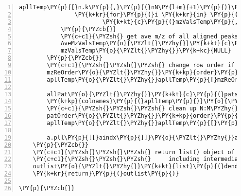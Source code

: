 \begin{Verbatim}[commandchars=\\\{\},codes={\catcode`\$=3\catcode`\^=7\catcode`\_=8},gobble=0,numbers=left,fontfamily=fvm,fontshape=n,fontsize=\footnotesize,tabsize=2]
				apllTemp\PY{p}{[}n.k\PY{p}{,}\PY{p}{(}nN\PY{l+m}{+1}\PY{p}{)}\PY{o}{:}\PY{p}{(}nN\PY{o}{+}nM\PY{p}{)}\PY{p}{]}\PY{o}{\PYZlt{}\PYZhy{}}Mpeaks\PY{p}{[}estPM\PY{p}{[}n.k\PY{p}{,}\PY{l+m}{2}\PY{p}{]}\PY{p}{,}\PY{p}{]}
				\PY{k+kr}{for}\PY{p}{(}i \PY{k+kr}{in} \PY{p}{(}nN\PY{l+m}{+1}\PY{p}{)}\PY{o}{:}\PY{p}{(}nN\PY{o}{+}nM\PY{p}{)}\PY{p}{)} \PY{k+kr}{if}\PY{p}{(}apllTemp\PY{p}{[}n.k\PY{p}{,}i\PY{p}{]}\PY{o}{\PYZgt{}}\PY{l+m}{0}\PY{p}{)} mzValsTemp\PY{o}{\PYZlt{}\PYZhy{}}
						\PY{k+kt}{c}\PY{p}{(}mzValsTemp\PY{p}{,}Mpeaklist\PY{p}{[[}i\PY{o}{\PYZhy{}}nN\PY{p}{]]}\PY{p}{[}\PY{l+m}{1}\PY{p}{,}apllTemp\PY{p}{[}n.k\PY{p}{,}i\PY{p}{]]}\PY{p}{)}
			\PY{p}{\PYZcb{}}
			\PY{c+c1}{\PYZsh{} get ave m/z of all aligned peaks}
			AveMzValsTemp\PY{o}{\PYZlt{}\PYZhy{}}\PY{k+kt}{c}\PY{p}{(}AveMzValsTemp\PY{p}{,}\PY{k+kp}{mean}\PY{p}{(}mzValsTemp\PY{p}{)}\PY{p}{)} 
			mzValsTemp\PY{o}{\PYZlt{}\PYZhy{}}\PY{k+kc}{NULL}
		\PY{p}{\PYZcb{}}
		\PY{c+c1}{\PYZsh{}\PYZsh{}\PYZsh{} change row order if averaging m/z has changed peak location order}
		mzReOrder\PY{o}{\PYZlt{}\PYZhy{}}\PY{k+kp}{order}\PY{p}{(}AveMzValsTemp\PY{p}{)}
		apllTemp\PY{o}{\PYZlt{}\PYZhy{}}apllTemp\PY{p}{[}mzReOrder\PY{p}{,}\PY{p}{]}
		
		allPat\PY{o}{\PYZlt{}\PYZhy{}}\PY{k+kt}{c}\PY{p}{(}patsToGetN\PY{p}{,}patsToGetM\PY{p}{)}
		\PY{k+kp}{colnames}\PY{p}{(}apllTemp\PY{p}{)}\PY{o}{\PYZlt{}\PYZhy{}}allPat
		\PY{c+c1}{\PYZsh{}\PYZsh{}\PYZsh{} clean up N:M\PYZhy{}alignment to preserve spectrum order}
		patOrder\PY{o}{\PYZlt{}\PYZhy{}}\PY{k+kp}{order}\PY{p}{(}allPat\PY{p}{)}
		apllTemp\PY{o}{\PYZlt{}\PYZhy{}}apllTemp\PY{p}{[}\PY{p}{,}patOrder\PY{p}{]}
		
		a.pll\PY{p}{[[}aindx\PY{p}{]]}\PY{o}{\PYZlt{}\PYZhy{}}apllTemp
	\PY{p}{\PYZcb{}}
	\PY{c+c1}{\PYZsh{}\PYZsh{}\PYZsh{} return list() object of peak amalgamation/alignment,}
	\PY{c+c1}{\PYZsh{}\PYZsh{}\PYZsh{}     including intermediate steps}
	outlist\PY{o}{\PYZlt{}\PYZhy{}}\PY{k+kt}{list}\PY{p}{(}dendro\PY{o}{=}hc\PY{p}{,}stepwise.peaks\PY{o}{=}a.pll\PY{p}{[}\PY{o}{\PYZhy{}}nAmal\PY{p}{]}\PY{p}{,}amalpeaks\PY{o}{=}a.pll\PY{p}{[[}nAmal\PY{p}{]]}\PY{p}{)}
	\PY{k+kr}{return}\PY{p}{(}outlist\PY{p}{)}

\PY{p}{\PYZcb{}}
\end{Verbatim}
